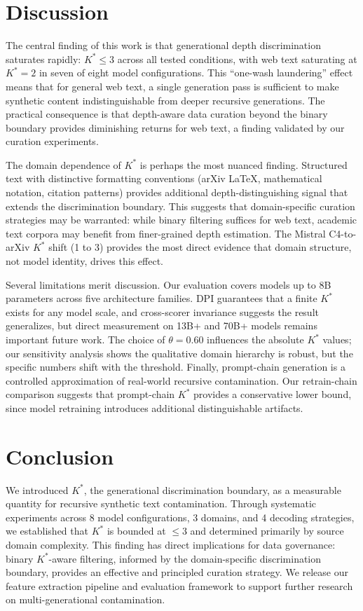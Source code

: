 \documentclass[11pt,a4paper]{article}
\newcommand{\Kstar}{K^{*}}
\begin{document}
\section{Discussion}

The central finding of this work is that generational depth discrimination saturates rapidly: $\Kstar \leq 3$ across all tested conditions, with web text saturating at $\Kstar = 2$ in seven of eight model configurations. This ``one-wash laundering'' effect means that for general web text, a single generation pass is sufficient to make synthetic content indistinguishable from deeper recursive generations. The practical consequence is that depth-aware data curation beyond the binary boundary provides diminishing returns for web text, a finding validated by our curation experiments.

The domain dependence of $\Kstar$ is perhaps the most nuanced finding. Structured text with distinctive formatting conventions (arXiv LaTeX, mathematical notation, citation patterns) provides additional depth-distinguishing signal that extends the discrimination boundary. This suggests that domain-specific curation strategies may be warranted: while binary filtering suffices for web text, academic text corpora may benefit from finer-grained depth estimation. The Mistral C4-to-arXiv $\Kstar$ shift (1 to 3) provides the most direct evidence that domain structure, not model identity, drives this effect.

Several limitations merit discussion. Our evaluation covers models up to 8B parameters across five architecture families. DPI guarantees that a finite $\Kstar$ exists for any model scale, and cross-scorer invariance suggests the result generalizes, but direct measurement on 13B+ and 70B+ models remains important future work. The choice of $\theta = 0.60$ influences the absolute $\Kstar$ values; our sensitivity analysis shows the qualitative domain hierarchy is robust, but the specific numbers shift with the threshold. Finally, prompt-chain generation is a controlled approximation of real-world recursive contamination. Our retrain-chain comparison suggests that prompt-chain $\Kstar$ provides a conservative lower bound, since model retraining introduces additional distinguishable artifacts.

\section{Conclusion}

We introduced $\Kstar$, the generational discrimination boundary, as a measurable quantity for recursive synthetic text contamination. Through systematic experiments across 8 model configurations, 3 domains, and 4 decoding strategies, we established that $\Kstar$ is bounded at $\leq 3$ and determined primarily by source domain complexity. This finding has direct implications for data governance: binary $\Kstar$-aware filtering, informed by the domain-specific discrimination boundary, provides an effective and principled curation strategy. We release our feature extraction pipeline and evaluation framework to support further research on multi-generational contamination.
\end{document}

